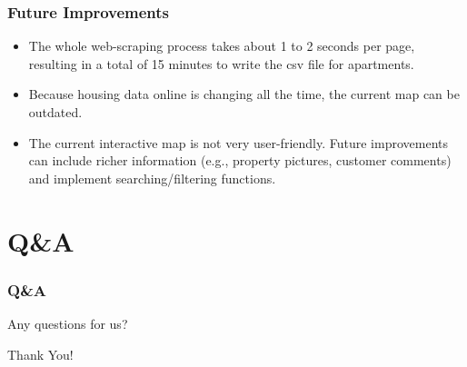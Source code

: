 \documentclass{beamer}
\begin{document}
\begin{frame}
	\frametitle{Future Improvements}
	\begin{itemize}
		\item The whole web-scraping process takes about 1 to 2 seconds per page, resulting in a total of 15 minutes to write the csv file for apartments.
		\item Because housing data online is changing all the time, the current map can be outdated.
		\item The current interactive map is not very user-friendly. Future improvements can include richer information (e.g., property pictures, customer comments) and implement searching/filtering functions.
	\end{itemize}
\end{frame}

\section{Q\&A}

\begin{frame}
	\frametitle{Q\&A}
	\begin{center}
	    Any questions for us?
	\end{center}
\end{frame}


\begin{frame}{}
  \centering \Large
  Thank You!
\end{frame}
\end{document}
